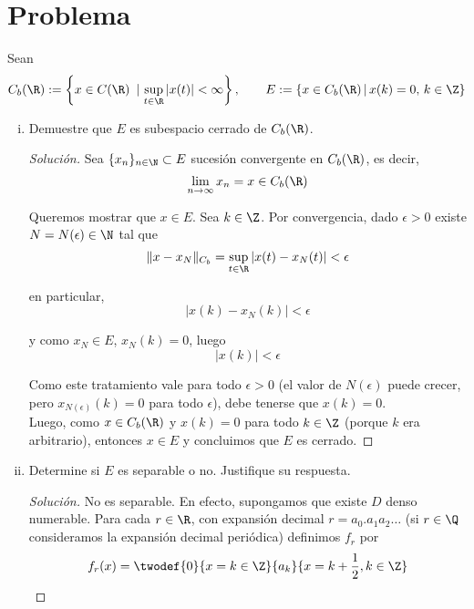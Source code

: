 \documentclass[duedate = 11 de Septiembre, 
			ramo = An\'alisis Funcional, 
			doctype = Tarea 1,
			semester = 2,
			year = 2017]{tarea}
\begin{document}
\begin{titlepage} 
\dotitlepage
\end{titlepage}


\pagestyle{empty}

\section*{Problema}
Sean
	$$C_{b}(\R) := \left\{x \in C(\R) \,|\, \sup_{t \in \R} |x(t)| < \infty\right\}, \qquad
		E := \left\{x \in C_{b}(\R) \,|\, x(k) = 0, \, k \in \Z\right\}$$
		
\begin{enumerate}[(i)]
	\item Demuestre que $E$ es subespacio cerrado de $C_{b}(\R)$.
	
	\begin{proof}[Solución] Sea $\{x_{n}\}_{n \in \N} \subset E$ sucesión convergente en $C_{b}(\R)$, es decir,
		$$\lim_{n \to \infty} x_{n} = x \in C_{b}(\R)$$
	
	Queremos mostrar que $x \in E$. Sea $k \in \Z$. Por convergencia, dado $\epsilon > 0$ existe $N = N(\epsilon) \in \N$ tal que
		$$\|x - x_{N}\|_{C_{b}} = \sup_{t \in \R} |x(t) - x_{N}(t)| < \epsilon$$
	
	en particular, 
		$$|x(k) - x_{N}(k)| < \epsilon$$ 
	
	y como $x_{N} \in E$, $x_{N}(k) = 0$, luego 
		$$|x(k)| < \epsilon$$
	
	Como este tratamiento vale para todo $\epsilon > 0$ (el valor de $N(\epsilon)$ puede crecer, pero $x_{N(\epsilon)}(k) = 0$ para todo $\epsilon$), debe tenerse que $x(k) = 0$.	\\
	
	Luego, como $x \in C_{b}(\R)$ y $x(k) =0 $ para todo $k \in \Z$ (porque $k$ era arbitrario), entonces $x \in E$ y concluimos que $E$ es cerrado.
	\end{proof}
	
	\newpage
	\item Determine si $E$ es separable o no. Justifique su respuesta.
	
	\begin{proof}[Solución] No es separable. En efecto, supongamos que existe $D$ denso numerable. Para cada $r \in \R$, con expansión decimal $r = a_{0}.a_{1}a_{2}\ldots$ (si $r \in \Q$ consideramos la expansión decimal periódica) definimos $f_{r}$ por
		$$f_{r}(x) = \twodef{0}{x = k \in \Z}
						{a_{k}}{x = k + \frac{1}{2}, k \in \Z}$$
					

\end{proof}
\end{enumerate}
\end{document}
